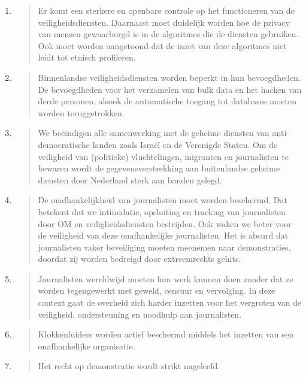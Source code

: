 \begin{enumerate}
\def\labelenumi{\arabic{enumi}.}
\item
  \begin{quote}
  Er komt een sterkere en openbare controle op het functioneren van de
  veiligheidsdiensten. Daarnaast moet duidelijk worden hoe de privacy
  van mensen gewaarborgd is in de algoritmes die de diensten gebruiken.
  Ook moet worden aangetoond dat de inzet van deze algoritmes niet leidt
  tot etnisch profileren.
  \end{quote}
\item
  \begin{quote}
  Binnenlandse veiligheidsdiensten worden beperkt in hun bevoegdheden.
  De bevoegdheden voor het verzamelen van bulk data en het hacken van
  derde personen, alsook de automatische toegang tot databases moeten
  worden teruggetrokken.
  \end{quote}
\item
  \begin{quote}
  We beëindigen alle samenwerking met de geheime diensten van
  anti-democratische landen zoals Israël en de Verenigde Staten. Om de
  veiligheid van (politieke) vluchtelingen, migranten en journalisten te
  bewaren wordt de gegevensverstrekking aan buitenlandse geheime
  diensten door Nederland sterk aan banden gelegd.
  \end{quote}
\item
  \begin{quote}
  De onafhankelijkheid van journalisten moet worden beschermd. Dat
  betekent dat we intimidatie, opsluiting en tracking van journalisten
  door OM en veiligheidsdiensten bestrijden. Ook waken we beter voor de
  veiligheid van deze onafhankelijke journalisten. Het is absurd dat
  journalisten vaker beveiliging moeten meenemen naar demonstraties,
  doordat zij worden bedreigd door extreemrechts gehits.
  \end{quote}
\item
  \begin{quote}
  Journalisten wereldwijd moeten hun werk kunnen doen zonder dat ze
  worden tegengewerkt met geweld, censuur en vervolging. In deze context
  gaat de overheid zich harder inzetten voor het vergroten van de
  veiligheid, ondersteuning en noodhulp aan journalisten.
  \end{quote}
\item
  \begin{quote}
  Klokkenluiders worden actief beschermd middels het inzetten van een
  onafhankelijke organisatie.
  \end{quote}
\item
  \begin{quote}
  Het recht op demonstratie wordt strikt nageleefd.
  \end{quote}
\end{enumerate}

